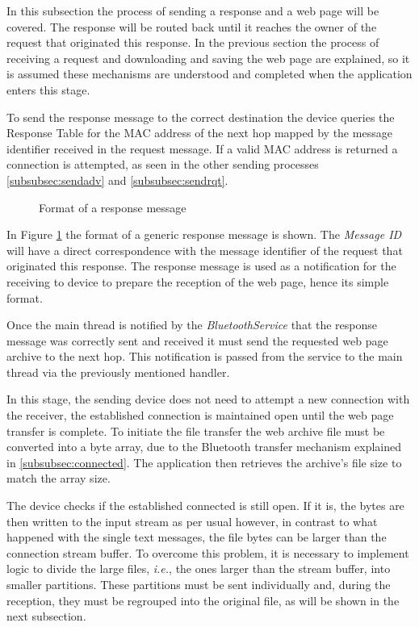 In this subsection the process of sending a response and a web page will be covered. The response will be routed back until it reaches the owner of the request that originated this response. In the previous section the process of receiving a request and downloading and saving the web page are explained, so it is assumed these mechanisms are understood and completed when the application enters this stage.

To send the response message to the correct destination the device queries the Response Table for the \gls{MAC} address of the next hop mapped by the message identifier received in the request message. If a valid \gls{MAC} address is returned a connection is attempted, as seen in the other sending processes \ref{subsubsec:sendadv} and \ref{subsubsec:sendrqt}.

\begin{figure}[ht]
   \noindent{}
	\caption{\label{fig:rspmsg} Format of a response message}
\end{figure}

In Figure \ref{fig:rspmsg} the format of a generic response message is shown. The \textit{Message ID} will have a direct correspondence with the message identifier of the request that originated this response. The response message is used as a notification for the receiving to device to prepare the reception of the web page, hence its simple format.

Once the main thread is notified by the \textit{BluetoothService} that the response message was correctly sent and received it must send the requested web page archive to the next hop. This notification is passed from the service to the main thread via the previously mentioned handler.

In this stage, the sending device does not need to attempt a new connection with the receiver, the established connection is maintained open until the web page transfer is complete. To initiate the file transfer the web archive file must be converted into a byte array, due to the Bluetooth transfer mechanism explained in \ref{subsubsec:connected}. The application then retrieves the archive's file size to match the array size.

The device checks if the established connected is still open. If it is, the bytes are then written to the input stream as per usual however, in contrast to what happened with the single text messages, the file bytes can be larger than the connection stream buffer. To overcome this problem, it is necessary to implement logic to divide the large files, \textit{i.e.}, the ones larger than the stream buffer, into smaller partitions. These partitions must be sent individually and, during the reception, they must be regrouped into the original file, as will be shown in the next subsection.

